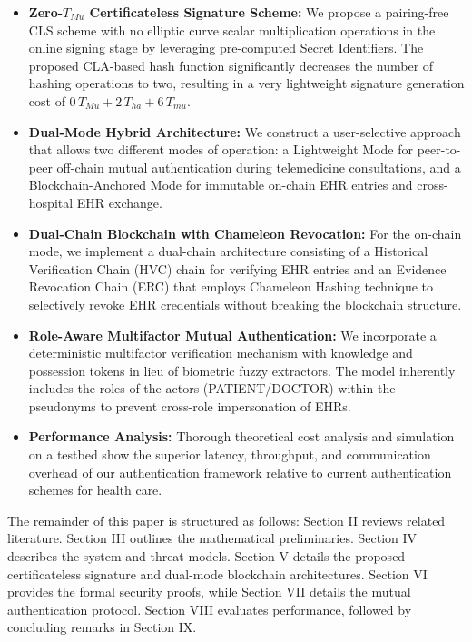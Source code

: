 \documentclass[conference]{IEEEtran}
\begin{document}
\begin{itemize}
\item \textbf{Zero-$T_{Mu}$ Certificateless Signature Scheme:} We propose a pairing-free CLS scheme with no elliptic curve scalar multiplication operations in the online signing stage by leveraging pre-computed Secret Identifiers. The proposed CLA-based hash function significantly decreases the number of hashing operations to two, resulting in a very lightweight signature generation cost of $0\,T_{Mu} + 2\,T_{ha} + 6\,T_{mu}$.

\item \textbf{Dual-Mode Hybrid Architecture:} We construct a user-selective approach that allows two different modes of operation: a Lightweight Mode for peer-to-peer off-chain mutual authentication during telemedicine consultations, and a Blockchain-Anchored Mode for immutable on-chain EHR entries and cross-hospital EHR exchange.

\item \textbf{Dual-Chain Blockchain with Chameleon Revocation:} For the on-chain mode, we implement a dual-chain architecture consisting of a Historical Verification Chain (HVC) chain for verifying EHR entries and an Evidence Revocation Chain (ERC) that employs Chameleon Hashing technique to selectively revoke EHR credentials without breaking the blockchain structure.


\item \textbf{Role-Aware Multifactor Mutual Authentication:} We incorporate a deterministic multifactor verification mechanism with knowledge and possession tokens in lieu of biometric fuzzy extractors. The model inherently includes the roles of the actors (PATIENT/DOCTOR) within the pseudonyms to prevent cross-role impersonation of EHRs.
\item \textbf{Performance Analysis:} Thorough theoretical cost analysis and simulation on a testbed show the superior latency, throughput, and communication overhead of our authentication framework relative to current authentication schemes for health care.

\end{itemize}

The remainder of this paper is structured as follows: Section II reviews related literature. Section III outlines the mathematical preliminaries. Section IV describes the system and threat models. Section V details the proposed certificateless signature and dual-mode blockchain architectures. Section VI provides the formal security proofs, while Section VII details the mutual authentication protocol. Section VIII evaluates performance, followed by concluding remarks in Section IX.
\end{document}
